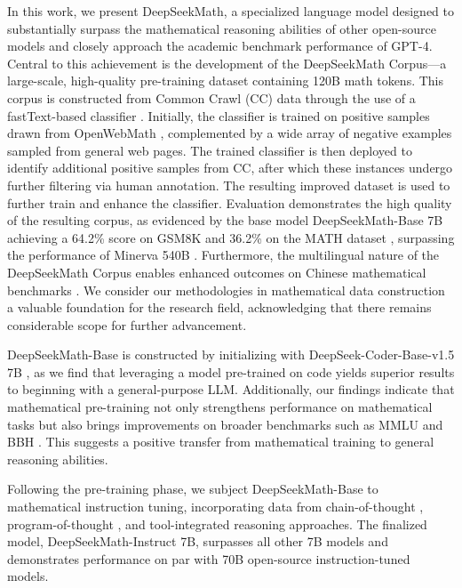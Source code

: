 In this work, we present DeepSeekMath, a specialized language model designed to substantially surpass the mathematical reasoning abilities of other open-source models and closely approach the academic benchmark performance of GPT-4. Central to this achievement is the development of the DeepSeekMath Corpus—a large-scale, high-quality pre-training dataset containing 120B math tokens. This corpus is constructed from Common Crawl (CC) data through the use of a fastText-based classifier \citep{joulin2016fasttext}. Initially, the classifier is trained on positive samples drawn from OpenWebMath \citep{openwebmath}, complemented by a wide array of negative examples sampled from general web pages. The trained classifier is then deployed to identify additional positive samples from CC, after which these instances undergo further filtering via human annotation. The resulting improved dataset is used to further train and enhance the classifier. Evaluation demonstrates the high quality of the resulting corpus, as evidenced by the base model DeepSeekMath-Base 7B achieving a 64.2\% score on GSM8K \citep{gsm8k} and 36.2\% on the MATH dataset \citep{MATH}, surpassing the performance of Minerva 540B \citep{minerva}. Furthermore, the multilingual nature of the DeepSeekMath Corpus enables enhanced outcomes on Chinese mathematical benchmarks \citep{wei2023cmath,agieval}. We consider our methodologies in mathematical data construction a valuable foundation for the research field, acknowledging that there remains considerable scope for further advancement.

DeepSeekMath-Base is constructed by initializing with DeepSeek-Coder-Base-v1.5 7B \citep{deepseek-coder}, as we find that leveraging a model pre-trained on code yields superior results to beginning with a general-purpose LLM. Additionally, our findings indicate that mathematical pre-training not only strengthens performance on mathematical tasks but also brings improvements on broader benchmarks such as MMLU \citep{mmlu} and BBH \citep{bbh}. This suggests a positive transfer from mathematical training to general reasoning abilities.

Following the pre-training phase, we subject DeepSeekMath-Base to mathematical instruction tuning, incorporating data from chain-of-thought \citep{cot}, program-of-thought \citep{pot,pal}, and tool-integrated reasoning \citep{tora} approaches. The finalized model, DeepSeekMath-Instruct 7B, surpasses all other 7B models and demonstrates performance on par with 70B open-source instruction-tuned models.

